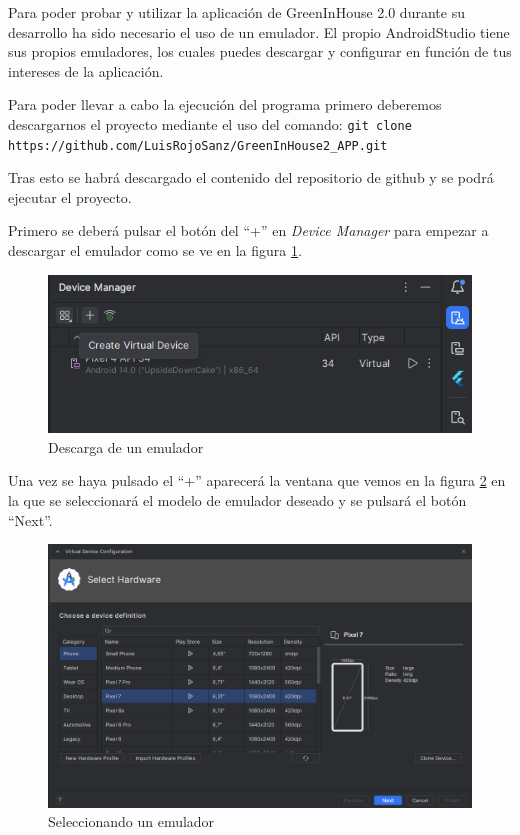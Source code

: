Para poder probar y utilizar la aplicación de GreenInHouse 2.0 durante su desarrollo ha sido necesario el uso de un emulador. El propio AndroidStudio tiene sus propios emuladores, los cuales puedes descargar y configurar en función de tus intereses de la aplicación.

Para poder llevar a cabo la ejecución del programa primero deberemos descargarnos el proyecto mediante el uso del comando:
\texttt{git clone https://github.com/LuisRojoSanz/GreenInHouse2\_APP.git}

Tras esto se habrá descargado el contenido del repositorio de github y se podrá ejecutar el proyecto.

Primero se deberá pulsar el botón del ``+'' en \textit{Device Manager} para empezar a descargar el emulador como se ve en la figura \ref{C12}.

\begin{figure}[H]
    \centering
    \includegraphics[width=0.8\linewidth]{InstalacionyEjecucion1.png}
    \caption{Descarga de un emulador}
    \label{C12}
\end{figure}

Una vez se haya pulsado el ``+'' aparecerá la ventana que vemos en la figura \ref{C13} en la que se seleccionará el modelo de emulador deseado y se pulsará el botón ``Next''.

\begin{figure}[H]
    \centering
    \includegraphics[width=0.8\linewidth]{InstalacionyEjecucion2.png}
    \caption{Seleccionando un emulador}
    \label{C13}
\end{figure}

